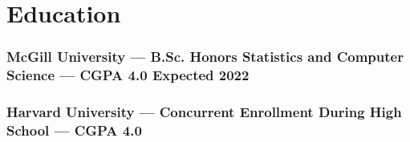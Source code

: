 \documentclass{article}
\begin{document}


\section{Education\hfill\normalsize }

\subsubsection{McGill University --- B.Sc. Honors Statistics and Computer Science --- CGPA 4.0 \hfill Expected 2022}


\subsubsection{Harvard University --- Concurrent Enrollment During High School --- CGPA 4.0}
\end{document}
